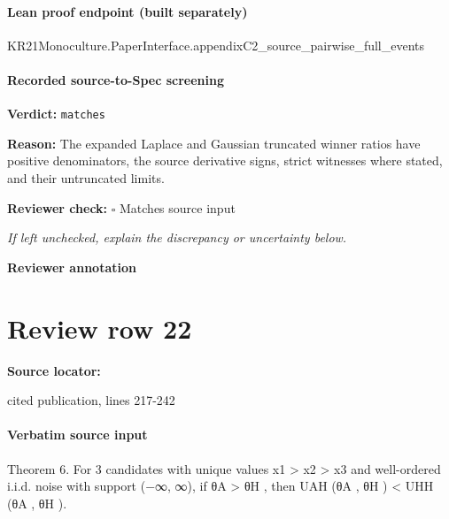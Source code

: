 \documentclass[10pt]{article}
\newcommand{\reviewerbox}{%
  \par\noindent\fbox{\parbox{0.96\linewidth}{\rule{0pt}{0.38in}}}\par
}
\newcommand{\reviewmatch}[1]{%
  \par\noindent\textbf{Reviewer check:} $\square$\; #1\par
  \noindent\emph{If left unchecked, explain the discrepancy or uncertainty below.}\par
}
\begin{document}
\paragraph{Lean proof endpoint (built separately)}\begin{ReviewVerbatim}
KR21Monoculture.PaperInterface.appendixC2_source_pairwise_full_events
\end{ReviewVerbatim}

\paragraph{Recorded source-to-Spec screening}
\textbf{Verdict:} \texttt{matches}
\\
{\raggedright
\textbf{Reason:} The expanded Laplace and Gaussian truncated winner ratios have positive denominators, the source derivative signs, strict witnesses where stated, and their untruncated limits.\allowbreak{}
\par}
\reviewmatch{Matches source input}
\noindent\textbf{Reviewer annotation}\par
\reviewerbox
\clearpage
\hypertarget{source-claim-231c9ba63e6b1424}{}
\section*{Review row 22}
\textbf{Source locator:} {\footnotesize\raggedright cited publication, lines 217-\allowbreak{}242\par}
\paragraph{Verbatim source input}
\begin{ReviewVerbatim}
Theorem 6. For 3 candidates with unique values x1 > x2 > x3 and well-ordered i.i.d. noise with support
(−∞, ∞), if θA > θH , then UAH (θA , θH ) < UHH (θA , θH ).
\end{ReviewVerbatim}
\end{document}
